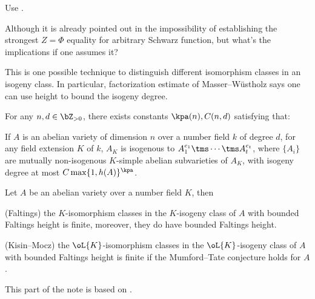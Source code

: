 \documentclass[a4paper, twoside]{article}
\begin{document}

Use \cite{YZ2018,YZ2018Erratum}.

\begin{qst}
	Although it is already pointed out in \cite{YZZ2013} the impossibility of establishing the strongest $Z=\Phi$ equality for arbitrary Schwarz function, but what's the implications if one assumes it?
\end{qst}


This is one possible technique to distinguish different isomorphism classes in an isogeny class. In particular, factorization estimate of Masser--W{\"u}stholz says one can use height to bound the isogeny degree.

\begin{thm}
	For any $n,d\in\bZ_{>0}$, there exists constants $\kpa(n),C(n,d)$ satisfying that:

	If $A$ is an abelian variety of dimension $n$ over a number field $k$ of degree $d$, for any field extension $K$ of $k$, $A_{K}$ is isogenous to $A_{1}^{e_{1}}\tms\cdots\tms A_{t}^{e_{t}}$, where $\{A_{i}\}$ are mutually non-isogenous $K$-simple abelian subvarieties of $A_{K}$, with isogeny degree at most $C\max\{1,h(A)\}^{\kpa}$.
\end{thm}



\begin{thm}
	Let $A$ be an abelian variety over a number field $K$, then
	\begin{enr}
		\item (Faltings) the $K$-isomorphism classes in the $K$-isogeny class of $A$ with bounded Faltings height is finite, moreover, they do have bounded Faltings height.
		\item (Kisin--Mocz) the $\oL{K}$-isomorphism classes in the $\oL{K}$-isogeny class of $A$ with bounded Faltings height is finite if the Mumford--Tate conjecture holds for $A$.
	\end{enr}
\end{thm}





This part of the note is based on \cite{Faltings1983,Faltings1983Erratum,Paris1985}.
\end{document}

